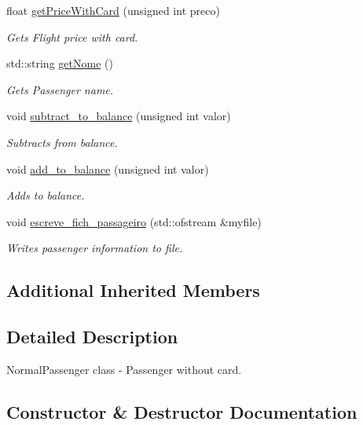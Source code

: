 \begin{DoxyCompactItemize}
float \hyperlink{class_passageiro_normal_a8932fec94ce61c2488b51c90955f3d34}{get\+Price\+With\+Card} (unsigned int preco)
\begin{DoxyCompactList}\small\item\em Gets Flight price with card. \end{DoxyCompactList}\item 
std\+::string \hyperlink{class_passageiro_normal_a09b0c8bc050ba663965559e94f5c5d1d}{get\+Nome} ()
\begin{DoxyCompactList}\small\item\em Gets Passenger name. \end{DoxyCompactList}\item 
void \hyperlink{class_passageiro_normal_ae54a661ff7ac80c35175ef925c460766}{subtract\+\_\+to\+\_\+balance} (unsigned int valor)
\begin{DoxyCompactList}\small\item\em Subtracts from balance. \end{DoxyCompactList}\item 
void \hyperlink{class_passageiro_normal_a8761222e6cd84eb8185507a591845a46}{add\+\_\+to\+\_\+balance} (unsigned int valor)
\begin{DoxyCompactList}\small\item\em Adds to balance. \end{DoxyCompactList}\item 
void \hyperlink{class_passageiro_normal_a86e91d053cc146d645dbc8356ea28d35}{escreve\+\_\+fich\+\_\+passageiro} (std\+::ofstream \&myfile)
\begin{DoxyCompactList}\small\item\em Writes passenger information to file. \end{DoxyCompactList}\end{DoxyCompactItemize}
\subsection*{Additional Inherited Members}


\subsection{Detailed Description}
Normal\+Passenger class -\/ Passenger without card. 

\subsection{Constructor \& Destructor Documentation}
\mbox{\label{class_passageiro_normal_a613fd301fc3f71910aa20d4d02b48222}} 
